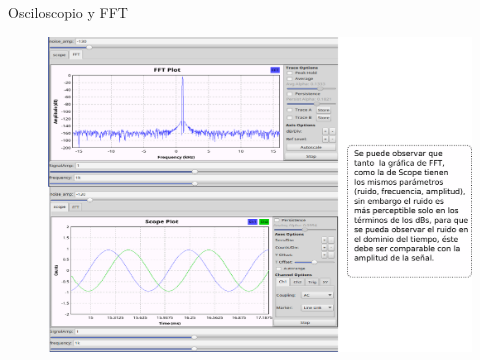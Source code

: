 \begin{frame}{Osciloscopio y FFT}
\begin{figure}[H]
\centering
\includegraphics[width=\textwidth, height=0.58\textwidth]{parte1/lab2/pdf/lab2_16.pdf}
\end{figure}
\end{frame}



